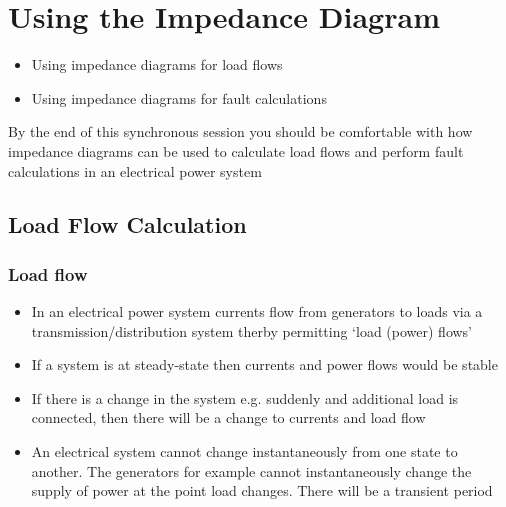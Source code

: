 \chapter{Using the Impedance Diagram}
\begin{itemize}
	\item Using impedance diagrams for load flows
	\item Using impedance diagrams for fault calculations
\end{itemize}
\begin{quoting}
	By the end of this synchronous session you should be comfortable with how impedance diagrams can be used to calculate load flows and perform fault calculations in an electrical power system
\end{quoting}
\section{Load Flow Calculation}
\subsection{Load flow}
\begin{itemize}
	\item In an electrical power system currents flow from generators to loads via a transmission/distribution system therby permitting `load (power) flows'
	\item If a system is at steady-state then currents and power flows would be stable
	\item If there is a change in the system e.g. suddenly and additional load is connected, then there will be a change to currents and load flow
	\item An electrical system cannot change instantaneously from one state to another. The generators for example cannot instantaneously change the supply of power at the point load changes. There will be a transient period
\end{itemize}
